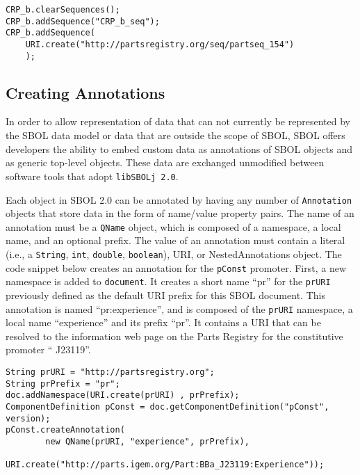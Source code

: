 \vspace{\abovedisplayskip}
\begin{minipage}{0.95\textwidth} 
\begin{lstlisting}
CRP_b.clearSequences();
CRP_b.addSequence("CRP_b_seq");
CRP_b.addSequence(
	URI.create("http://partsregistry.org/seq/partseq_154")
	);
\end{lstlisting}
\end{minipage}

\subsection*{Creating Annotations}
In order to allow representation of data that can not currently be represented
by the SBOL data model or data that are outside the scope of SBOL,
SBOL offers developers the ability to embed custom data as annotations
of SBOL objects and as generic top-level objects. These data are exchanged unmodified between
software tools that adopt {\tt libSBOLj 2.0}. 

Each object in SBOL 2.0 can be annotated by having any number of
\lstinline+Annotation+ objects that store data in the form of name/value 
property pairs. The name of an annotation must be a \lstinline+QName+
object, which is composed of a namespace, a
local name, and an optional prefix. The value of an annotation must contain a literal (i.e., a
\lstinline+String+, \lstinline+int+, \lstinline+double+,
\lstinline+boolean+), URI, or NestedAnnotations object. The code
snippet below creates an annotation for the \lstinline+pConst+ promoter. First, a new namespace is added to \lstinline+document+. It creates a short name ``pr'' for the \lstinline+prURI+
previously defined as the default URI prefix for this SBOL
document. This annotation is named ``pr:experience'', and is composed of
the \lstinline+prURI+ namespace, a local name ``experience'' and its prefix ``pr''.  It
contains a URI that can be resolved to the information web page
on the Parts Registry for the constitutive promoter `` J23119''.

\vspace{\abovedisplayskip}
\begin{minipage}{0.95\textwidth} 
\begin{lstlisting}
String prURI = "http://partsregistry.org"; 
String prPrefix = "pr";
doc.addNamespace(URI.create(prURI) , prPrefix);
ComponentDefinition pConst = doc.getComponentDefinition("pConst", version);
pConst.createAnnotation(
        new QName(prURI, "experience", prPrefix),
        URI.create("http://parts.igem.org/Part:BBa_J23119:Experience"));
\end{lstlisting}
\end{minipage}

